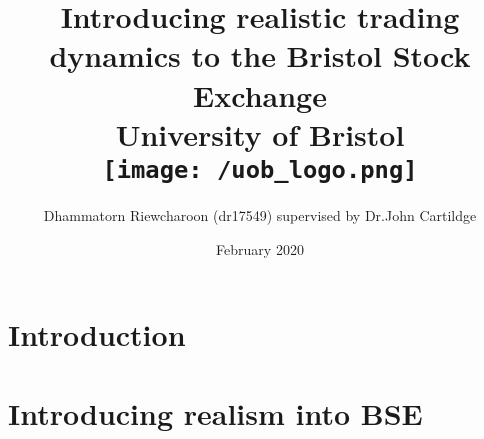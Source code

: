 \documentclass[12pt]{report}
\title{
{Introducing realistic trading dynamics to the Bristol Stock Exchange}\\
{\large University of Bristol}\\
{\texttt{[image: /uob\_logo.png]}}
}
\author{Dhammatorn Riewcharoon (dr17549) supervised by Dr.John Cartildge }
\date{February 2020}
\begin{document}
\maketitle
\newpage
\tableofcontents{}
\newpage

\chapter{Introduction}


\chapter{Introducing realism into BSE} 


\end{document}
